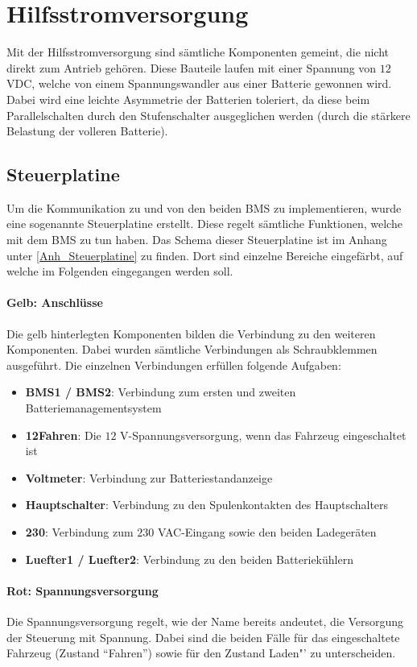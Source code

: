 \section{Hilfsstromversorgung}
Mit der Hilfsstromversorgung sind sämtliche Komponenten gemeint, die nicht direkt zum Antrieb gehören. Diese Bauteile laufen mit einer Spannung von $12$ VDC, welche von einem Spannungswandler aus einer Batterie gewonnen wird. Dabei wird eine leichte Asymmetrie der Batterien toleriert, da diese beim Parallelschalten durch den Stufenschalter ausgeglichen werden (durch die stärkere Belastung der volleren Batterie).

\subsection{Steuerplatine} \label{steuerplatine}
Um die Kommunikation zu und von den beiden BMS zu implementieren, wurde eine sogenannte Steuerplatine erstellt. Diese regelt sämtliche Funktionen, welche mit dem BMS zu tun haben. Das Schema dieser Steuerplatine ist im Anhang unter \ref{Anh_Steuerplatine} zu finden. Dort sind einzelne Bereiche eingefärbt, auf welche im Folgenden eingegangen werden soll.

\paragraph{Gelb: Anschlüsse}
Die gelb hinterlegten Komponenten bilden die Verbindung zu den weiteren Komponenten. Dabei wurden sämtliche Verbindungen als Schraubklemmen ausgeführt. Die einzelnen Verbindungen erfüllen folgende Aufgaben: \begin{itemize}
	\item \textbf{BMS1 / BMS2}: Verbindung zum ersten und zweiten Batteriemanagementsystem
	\item \textbf{12Fahren}: Die $12$ V-Spannungsversorgung, wenn das Fahrzeug eingeschaltet ist
	\item \textbf{Voltmeter}: Verbindung zur Batteriestandanzeige
	\item \textbf{Hauptschalter}: Verbindung zu den Spulenkontakten des Hauptschalters
	\item \textbf{230}: Verbindung zum $230$ VAC-Eingang sowie den beiden Ladegeräten
	\item \textbf{Luefter1 / Luefter2}: Verbindung zu den beiden Batteriekühlern
\end{itemize}

\paragraph{Rot: Spannungsversorgung}
Die Spannungsversorgung regelt, wie der Name bereits andeutet, die Versorgung der Steuerung mit Spannung. Dabei sind die beiden Fälle für das eingeschaltete Fahrzeug (Zustand "`Fahren"') sowie für den Zustand \grqq Laden"' zu unterscheiden.

